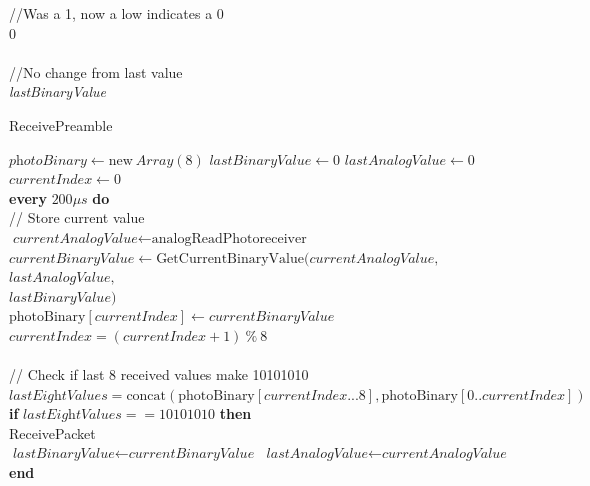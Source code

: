 \documentclass[letterpaper,10pt]{article}
\begin{document}
\begin{spacing}{1.15}
\begin{algorithm}[H]
\begin{algorithmic}[1]
		//Was a 1, now a low indicates a 0
		 \\
		\quad \Return $0$\\\\
		
		//No change from last value
		\Else\\
		\quad \Return \textit{lastBinaryValue}
		\EndIf
	\end{algorithmic}
\end{algorithm}

\begin{algorithm}[H]
	\caption{ReceivePreamble}\label{algo-2}
	\begin{algorithmic}[1]
		\State $\textit{photoBinary} \gets \text{new}\ \textit{Array}(8)$
		\State $\textit{lastBinaryValue} \gets 0$
		\State $\textit{lastAnalogValue} \gets 0$
		\State $currentIndex \gets 0$\\
		
		\State \textbf{every} $200 \mu s$ \textbf{do}\\
		\quad // Store current value\\
		\quad $\textit{currentAnalogValue} \gets \text{analogReadPhotoreceiver}$\\
		\quad $\textit{currentBinaryValue} \gets \text{GetCurrentBinaryValue}(\textit{currentAnalogValue},$\\ 
		\hspace{7.65cm} $\textit{lastAnalogValue},$\\
		\hspace{7.65cm} $\textit{lastBinaryValue})$ \\
		\quad $\text{photoBinary}[\textit{currentIndex}] \gets \textit{currentBinaryValue}$\\
		\quad $\textit{currentIndex} = (\textit{currentIndex} + 1)\ \%\ 8$\\\\
		
		\quad // Check if last 8 received values make 10101010 
		\State \quad $\textit{lastEightValues} = \text{concat}(\text{photoBinary}[\textit{currentIndex}...8],\text{photoBinary}[0..\textit{currentIndex}])$ \\
		\quad \textbf{if} $\textit{lastEightValues} == 10101010$ \textbf{then}\\
		\quad \quad ReceivePacket\\
		
		\State \quad $\textit{lastBinaryValue} \gets \textit{currentBinaryValue}$
		\State \quad $\textit{lastAnalogValue} \gets \textit{currentAnalogValue}$
		\State \textbf{end}		
	\end{algorithmic}
\end{algorithm}


\end{spacing}
\end{document}
